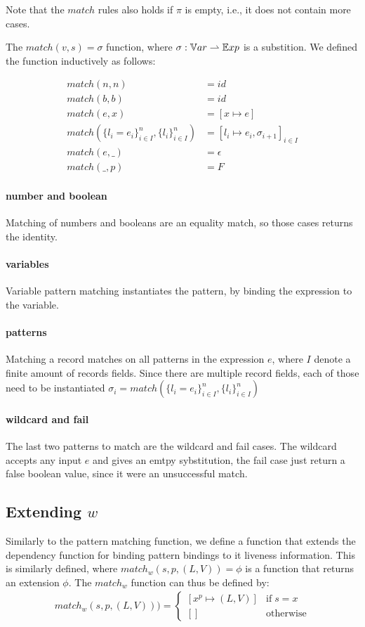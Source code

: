 \documentclass[../../master.tex]{subfiles}
\begin{document}
Note that the $match$ rules also holds if $\pi$ is empty, i.e., it does not contain more cases.

The $match(v,s)=\sigma$ function, where $\sigma:\mathbb{V}ar \rightharpoonup \mathbb{E}xp$ is a substition.
We defined the function inductively as follows:

\begin{align*}
	match(n,n) &= id\\
	match(b,b) &= id\\
	match(e,x) &= [x \mapsto e]\\
	match(\{l_i=e_i\}^n_{i \in I},\{l_i\}^n_{i \in I}) &= [l_i \mapsto e_i, \sigma_{i+1}]_{i \in I}\\
	match(e,\_) &=\epsilon\\
	match(\_,p) &= F
\end{align*}

\paragraph{number and boolean}
Matching of numbers and booleans are an equality match, so those cases returns the identity.

\paragraph{variables}
Variable pattern matching instantiates the pattern, by binding the expression to the variable.

\paragraph{patterns}
Matching a record matches on all patterns in the expression $e$, where $I$ denote a finite amount of records fields.
Since there are multiple record fields, each of those need to be instantiated
$\sigma_i=match(\{l_i=e_i\}^n_{i \in I},\{l_i\}^n_{i \in I})$

\paragraph{wildcard and fail}
The last two patterns to match are the wildcard and fail cases.
The wildcard accepts any input $e$ and gives an emtpy sybstitution, the fail case just return a false boolean value, since it were an unsuccessful match.


\subsection{Extending $w$}
Similarly to the pattern matching function, we define a function that extends the dependency function for binding pattern bindings to it liveness information.
This is similarly defined, where $match_w(s,p,(L,V))=\phi$ is a function that returns an extension $\phi$.
The $match_w$ function can thus be defined by:
\begin{align}
	match_w(s,p,(L,V))) =
	\left\{\begin{matrix}
		[x^p\mapsto (L,V)] & \mbox{if}\; s=x\\ 
		[] & \mbox{otherwise}
	\end{matrix}\right.
\end{align}
\end{document}
